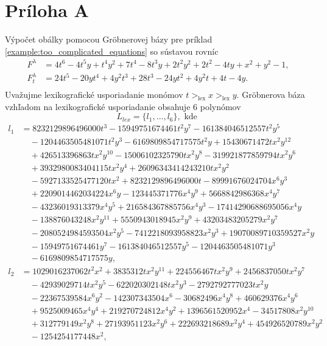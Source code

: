 \chapter{Príloha A}
\label{pri:priloha1}
Výpočet obálky pomocou Gröbnerovej bázy pre príklad \ref{example:too_complicated_equations} so sústavou rovníc
\begin{align*}
F^\lambda &= 4 t^6 - 4 t^5 y + t^4 y^2 + 7 t^4 - 8 t^3 y + 2 t^2 y^2 + 2 t^2 - 4 t y + x^2 + y^2 - 1, \\
F_t^\lambda &= 24t^5-20yt^4+4y^2t^3+28t^3-24yt^2+4y^2t+4t-4y. \\
\end{align*}
Uvažujme lexikografické usporiadanie monómov $t >_{\text{lex}}x>_{\text{lex}}y.$
Gröbnerova báza vzhľadom na lexikografické usporiadanie obsahuje $6$ polynómov
$$ L_{lex} = \{l_1,\dots, l_6 \}, \text{ kde } $$
\begin{align*}
l_1 &= 8232129896496000t^3 - 15949751674461t^2y^7 - 161384046512557t^2y^5 \\
&\quad - 1204463505481071t^2y^3 - 6169809854717575t^2y + 15430671472tx^2y^{12} \\
&\quad + 426513396863tx^2y^{10} - 15006102325790tx^2y^8 - 319921877859794tx^2y^6 \\
&\quad + 3932980083404115tx^2y^4 + 26096343414243210tx^2y^2 \\
&\quad - 5927133525477120tx^2 + 8232129896496000t - 89991676024704x^6y^3  \\
&\quad + 2209014462034224x^6y - 123445371776x^4y^9 + 5668842986368x^4y^7 \\ 
&\quad - 43236019313379x^4y^5 + 216584367885756x^4y^3 - 17414290688695056x^4y \\
&\quad - 138876043248x^2y^{11} + 5550943018945x^2y^9 + 43203483205279x^2y^7 \\
&\quad - 2080524984593504x^2y^5 - 7412218093958823x^2y^3 + 19070089710359527x^2y \\
&\quad - 15949751674461y^7 - 161384046512557y^5 - 1204463505481071y^3 \\
&\quad - 6169809854717575y, \\
l_2 &= 1029016237062t^2x^2 + 3835312tx^2y^{11} + 224556467tx^2y^9 + 2456837050tx^2y^7 \\
&\quad - 42939029714tx^2y^5 - 622020302148tx^2y^3 - 2792792777023tx^2y \\
&\quad - 22367539584x^6y^2 - 142307343504x^6 - 30682496x^4y^8 + 460629376x^4y^6 \\
&\quad + 9525009465x^4y^4 + 219270724812x^4y^2 + 1396561520952x^4 - 34517808x^2y^{10} \\
&\quad + 312779149x^2y^8 + 27193951123x^2y^6 + 222693218689x^2y^4 + 454926520789x^2y^2 \\
&\quad - 1254254177448x^2, \\
\end{align*}
